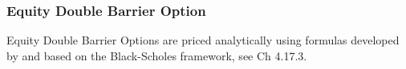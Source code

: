 \subsubsection{Equity Double Barrier Option}
\label{pricing:eq_doublebarrieroption}

Equity Double Barrier Options are priced analytically using formulas developed by
\cite{Merton_1973} and \cite{Rubinstein_1991} based on the Black-Scholes framework, 
see \cite{Haug_1997} Ch 4.17.3.
